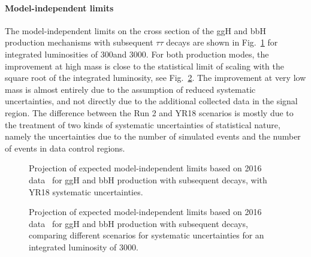 \paragraph{Model-independent limits}
\label{sec:model_indep}

The model-independent limits on the cross section of the ggH and bbH production mechanisms with subsequent $\tau\tau$ decays are shown in Fig.~\ref{fig:model_indep} for 
integrated luminosities of 300\fbinv and 3000\fbinv.
For both production modes, the improvement at high mass is close to the statistical limit of scaling with the square root of the integrated luminosity, 
see Fig.~\ref{fig:model_indep2}. 
The improvement at very low mass is almost entirely due to the assumption of reduced systematic uncertainties, and not directly due to 
the additional collected data in the signal region. The difference between the Run 2 and YR18 scenarios is mostly due to the treatment 
of two kinds of systematic uncertainties of statistical nature, namely the uncertainties due to the number of simulated events and the number 
of events in data control regions.
%
\begin{figure}[htbp]
\begin{center}
\end{center}
\caption{Projection of expected model-independent limits based on 2016 data~\cite{HIG-17-020} for ggH and bbH production with subsequent \htt decays, with YR18 systematic uncertainties.}
\label{fig:model_indep}
\end{figure}
%
\begin{figure}[htbp]
\begin{center}
\end{center}
\caption{Projection of expected model-independent limits based on 2016 data~\cite{HIG-17-020} for ggH and bbH production with subsequent \htt decays, comparing different 
scenarios for systematic uncertainties for an integrated luminosity of 3000\fbinv.}
\label{fig:model_indep2}
\end{figure}

